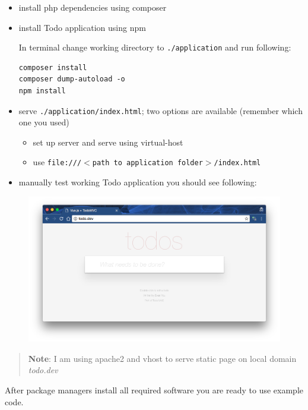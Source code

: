 \begin{itemize}
\item install php dependencies using composer

\item install Todo application using npm

In terminal change working directory to \texttt{.\slash application} and run following:

\begin{verbatim}
composer install
composer dump-autoload -o
npm install
\end{verbatim}
\item serve \texttt{.\slash application\slash index.html}; two options are available (remember which one you used)

\begin{itemize}
\item set up server and serve using virtual-host
\item use \texttt{file://\slash $<$path to application folder$>$\slash index.html}
\end{itemize}
\item manually test working Todo application you should see following:
\end{itemize}

\begin{figure}[htbp]
\centering
\includegraphics[keepaspectratio,width=\textwidth,height=0.75\textheight]{img/vue-js-todo.png}
\end{figure}

\begin{quote}
\textbf{Note}: I am using apache2 and vhost to serve static page on local domain \emph{todo.dev}
\end{quote}

After package managers install all required software you are ready to use example code.

